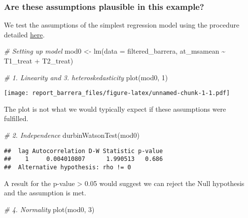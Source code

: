 \documentclass[
]{article}
\newenvironment{Shaded}{\begin{snugshade}}{\end{snugshade}}
\newcommand{\AttributeTok}[1]{\textcolor[rgb]{0.77,0.63,0.00}{#1}}
\newcommand{\CommentTok}[1]{\textcolor[rgb]{0.56,0.35,0.01}{\textit{#1}}}
\newcommand{\DecValTok}[1]{\textcolor[rgb]{0.00,0.00,0.81}{#1}}
\newcommand{\FunctionTok}[1]{\textcolor[rgb]{0.00,0.00,0.00}{#1}}
\newcommand{\NormalTok}[1]{#1}
\newcommand{\OtherTok}[1]{\textcolor[rgb]{0.56,0.35,0.01}{#1}}
\newcommand{\SpecialCharTok}[1]{\textcolor[rgb]{0.00,0.00,0.00}{#1}}
\begin{document}
\hypertarget{are-these-assumptions-plausible-in-this-example}{%
\subsubsection{Are these assumptions plausible in this
example?}\label{are-these-assumptions-plausible-in-this-example}}

We test the assumptions of the simplest regression model using the
procedure detailed
\href{https://godatadrive.com/blog/basic-guide-to-test-assumptions-of-linear-regression-in-r}{here}.

\begin{Shaded}
\begin{Highlighting}[]
\CommentTok{\# Setting up model}
\NormalTok{mod0 }\OtherTok{\textless{}{-}} \FunctionTok{lm}\NormalTok{(}\AttributeTok{data =}\NormalTok{ filtered\_barrera, at\_msamean }\SpecialCharTok{\textasciitilde{}}\NormalTok{ T1\_treat }\SpecialCharTok{+}\NormalTok{ T2\_treat)}
\end{Highlighting}
\end{Shaded}

\begin{Shaded}
\begin{Highlighting}[]
\CommentTok{\# 1. Linearity and 3. heteroskedasticity}
\FunctionTok{plot}\NormalTok{(mod0, }\DecValTok{1}\NormalTok{)}
\end{Highlighting}
\end{Shaded}

\texttt{[image: report\_barrera\_files/figure-latex/unnamed-chunk-1-1.pdf]}

The plot is not what we would typically expect if these assumptions were
fulfilled.

\begin{Shaded}
\begin{Highlighting}[]
\CommentTok{\# 2. Independence}
\FunctionTok{durbinWatsonTest}\NormalTok{(mod0)}
\end{Highlighting}
\end{Shaded}

\begin{verbatim}
##  lag Autocorrelation D-W Statistic p-value
##    1     0.004010807      1.990513   0.686
##  Alternative hypothesis: rho != 0
\end{verbatim}

A result for the p-value \textgreater{} 0.05 would suggest we can reject
the Null hypothesis and the assumption is met.

\begin{Shaded}
\begin{Highlighting}[]
\CommentTok{\# 4. Normality}
\FunctionTok{plot}\NormalTok{(mod0, }\DecValTok{3}\NormalTok{)}
\end{Highlighting}
\end{Shaded}
\end{document}
